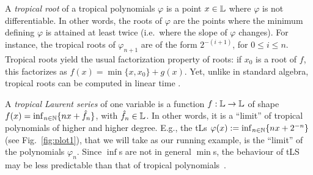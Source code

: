 A \emph{tropical root} of a tropical polynomials $\varphi$ is a point $x\in \mathbb{L}$ where $\varphi$ is not differentiable. In other words, the roots of $\varphi$ are the points where the minimum defining $\varphi$ is attained at least twice (i.e.~where the slope of $\varphi$ changes).
For instance, the tropical roots of $\varphi_{n+1}$ are of the form $2^{-(i+1)}$, for $0\leq i \leq n$.
Tropical roots yield the usual factorization property of roots: if $x_{0}$ is a root of $f$, this factorizes as
$f(x)=\min\{x,x_{0}\}+ g(x)$. Yet, unlike in standard algebra, tropical roots can be computed in linear time \cite{Noferini2015}.
%

A \emph{tropical Laurent series} of one variable is a function $f:\mathbb{L}\to\mathbb{L}$ of shape $f(x)=\inf_{n\in\mathbb{N}}\{nx+\hat{f}_{n}\}$, with $\hat{f}_{n}\in\mathbb{L}$.
In other words, it is a ``limit'' of tropical polynomials of higher and higher degree.
E.g., the tLs $\varphi(x):=\inf_{n\in\mathbb{N}}\{nx+2^{-n}\}$ (see Fig.~\ref{fig:plot1}), that we will take as our running example, 
is the ``limit'' of the polynomials $\varphi_{n}$.
Since $\inf$s are not in general $\min$s, the behaviour of tLS may be less predictable than that of tropical polynomials~\cite{Porzio2021}. %

%
%



